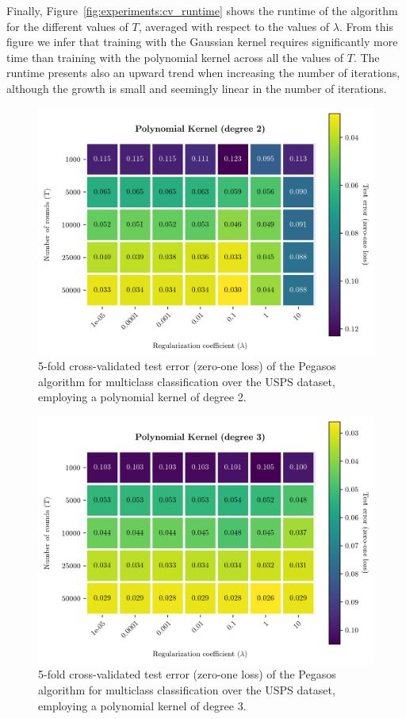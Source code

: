 \documentclass[runningheads]{llncs}
\begin{document}
Finally, Figure~\ref{fig:experiments:cv_runtime} shows the runtime of the algorithm for the different values of $T$, averaged with respect to the values of $\lambda$. From this figure we infer that training with the Gaussian kernel requires significantly more time than training with the polynomial kernel across all the values of $T$. The runtime presents also an upward trend when increasing the number of iterations, although the growth is small and seemingly linear in the number of iterations. 

\begin{figure}
  \center
  \includegraphics[width=0.8\linewidth]{../img/poly_2_error.png}
  \caption{5-fold cross-validated test error (zero-one loss) of the Pegasos algorithm for multiclass classification over the USPS dataset, employing a polynomial kernel of degree 2.} 
  \label{fig:experiments:polynomial_2}
\end{figure}

\begin{figure}
  \center
  \includegraphics[width=0.8\linewidth]{../img/poly_3_error.png}
  \caption{5-fold cross-validated test error (zero-one loss) of the Pegasos algorithm for multiclass classification over the USPS dataset, employing a polynomial kernel of degree 3.} 
  \label{fig:experiments:polynomial_3}
\end{figure}
\end{document}
